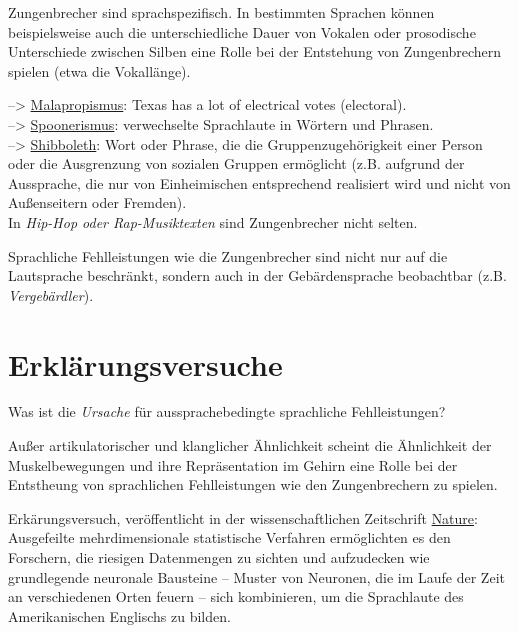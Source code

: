 \documentclass[
  letterpaper,
]{scrbook}
\begin{document}
Zungenbrecher sind sprachspezifisch. In bestimmten Sprachen können
beispielsweise auch die unterschiedliche Dauer von Vokalen oder
prosodische Unterschiede zwischen Silben eine Rolle bei der Entstehung
von Zungenbrechern spielen (etwa die Vokallänge).

--\textgreater{}
\href{https://en.wikipedia.org/wiki/Malapropism}{Malapropismus}: Texas
has a lot of electrical votes (electoral).\\
--\textgreater{}
\href{https://en.wikipedia.org/wiki/Spoonerism}{Spoonerismus}:
verwechselte Sprachlaute in Wörtern und Phrasen.\\
--\textgreater{}
\href{https://en.wikipedia.org/wiki/Shibboleth}{Shibboleth}: Wort oder
Phrase, die die Gruppenzugehörigkeit einer Person oder die Ausgrenzung
von sozialen Gruppen ermöglicht (z.B. aufgrund der Aussprache, die nur
von Einheimischen entsprechend realisiert wird und nicht von
Außenseitern oder Fremden).\\

In \emph{Hip-Hop oder Rap-Musiktexten} sind Zungenbrecher nicht selten.

Sprachliche Fehlleistungen wie die Zungenbrecher sind nicht nur auf die
Lautsprache beschränkt, sondern auch in der Gebärdensprache beobachtbar
(z.B. \emph{Vergebärdler}).

\hypertarget{erkluxe4rungsversuche}{%
\section{Erklärungsversuche}\label{erkluxe4rungsversuche}}

Was ist die \emph{Ursache} für aussprachebedingte sprachliche
Fehlleistungen?

Außer artikulatorischer und klanglicher Ähnlichkeit scheint die
Ähnlichkeit der Muskelbewegungen und ihre Repräsentation im Gehirn eine
Rolle bei der Entstheung von sprachlichen Fehlleistungen wie den
Zungenbrechern zu spielen.

Erkärungsversuch, veröffentlicht in der wissenschaftlichen Zeitschrift
\href{https://www.nature.com/articles/nature.2013.12471.pdf}{Nature}:\\

Ausgefeilte mehrdimensionale statistische Verfahren ermöglichten es den
Forschern, die riesigen Datenmengen zu sichten und aufzudecken wie
grundlegende neuronale Bausteine -- Muster von Neuronen, die im Laufe
der Zeit an verschiedenen Orten feuern -- sich kombinieren, um die
Sprachlaute des Amerikanischen Englischs zu bilden.
\end{document}
